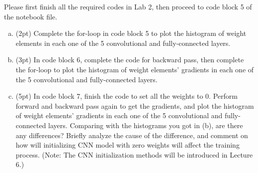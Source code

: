 \begin{assignment}
Please first finish all the required codes in Lab 2, then proceed to code block 5 of the notebook file.

\begin{enumerate}[(a)]
\item (2pt) Complete the for-loop in code block 5 to plot the histogram of weight elements in each one of the 5 convolutional and fully-connected layers.
\item (3pt) In code block 6, complete the code for backward pass, then complete the for-loop to plot the histogram of weight elements' gradients in each one of the 5 convolutional and fully-connected layers. 
\item (5pt) In code block 7, finish the code to set all the weights to 0. Perform forward and backward pass again to get the gradients, and plot the histogram of weight elements' gradients in each one of the 5 convolutional and fully-connected layers. Comparing with the histograms you got in (b), are there any differences? Briefly analyze the cause of the difference, and comment on how will initializing CNN model with zero weights will affect the training process. (Note: The CNN initialization methods will be introduced in Lecture 6.)  
\end{enumerate}
\end{assignment}

